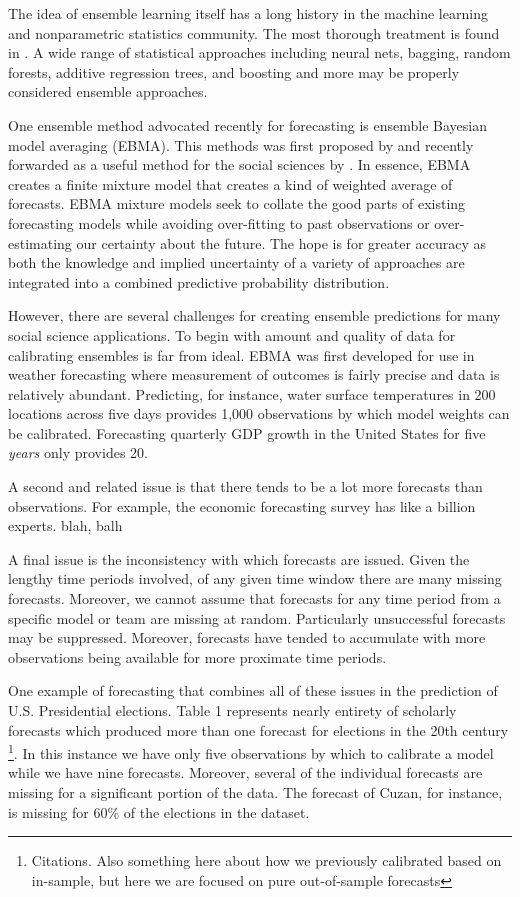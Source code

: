 \documentclass[12pt,fullpage,endnotes]{article}
\begin{document}
The idea of ensemble learning itself has a long history in the machine
learning and nonparametric statistics community. The most thorough
treatment is found in \citet{Hastie:2009}. A wide range of statistical
approaches including neural nets, bagging, random forests, additive
regression trees, and boosting and more may be properly considered
ensemble approaches.  

One ensemble method advocated recently for forecasting is ensemble
Bayesian model averaging (EBMA). This methods was first proposed by
\citet{Raftery:2005} and recently forwarded as a useful method for the
social sciences by \citet{Montgomery:2012a}. In essence, EBMA creates a
finite mixture model that creates a kind of weighted average of
forecasts.  EBMA mixture models seek to collate the good parts of
existing forecasting models while avoiding over-fitting to past
observations or over-estimating our certainty about the future.  The
hope is for greater accuracy as both the knowledge and implied
uncertainty of a variety of approaches are integrated into a combined
predictive probability distribution.

However, there are several challenges for creating ensemble
predictions for many social science applications.  To begin with
amount and quality of data for calibrating ensembles is far from
ideal.  EBMA was first developed for use in weather forecasting where
measurement of outcomes is fairly precise and data is relatively
abundant.  Predicting, for instance, water surface temperatures in 200
locations across five days provides 1,000 observations by which model
weights can be calibrated.  Forecasting quarterly GDP
growth in the United States for five \textit{years} only provides 20.

A second and related issue is that there tends to be a lot more
forecasts than observations.  For example, the economic forecasting
survey has like a billion experts.  blah, balh

A final issue is the inconsistency with which forecasts are
issued. Given the lengthy time periods involved, of any given time
window there are many missing forecasts.  Moreover, we cannot assume
that forecasts for any time period from a specific model or team are
missing at random.  Particularly unsuccessful forecasts may be
suppressed.  Moreover, forecasts have tended to accumulate with more
observations being available for more proximate time periods.

One example of forecasting that combines all of these issues in the
prediction of U.S. Presidential elections.  Table 1 represents nearly
entirety of scholarly forecasts which produced more than one forecast
for elections in the 20th century \footnote{Citations.  Also something
  here about how we previously calibrated based on in-sample, but here
  we are focused on pure out-of-sample forecasts}.  In this instance
we have only five observations by which to calibrate a model while we
have nine forecasts.  Moreover, several of the individual forecasts
are missing for a significant portion of the data.  The forecast of
Cuzan, for instance, is missing for 60\% of the elections in the
dataset.
\end{document}
